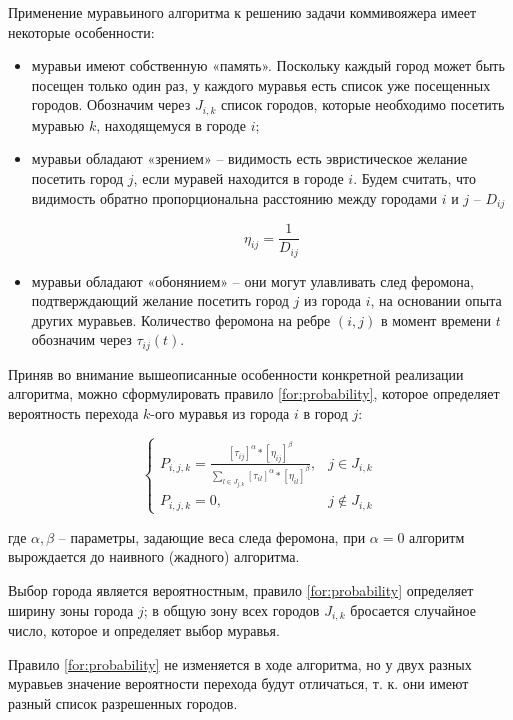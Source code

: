 Применение муравьиного алгоритма к решению задачи коммивояжера имеет некоторые особенности:
\begin{itemize}
\item муравьи имеют собственную «память». Поскольку каждый город может быть посещен только один раз, у каждого муравья есть список уже посещенных городов. Обозначим через $J_{i,k}$ список городов, которые необходимо посетить муравью $k$, находящемуся в городе $i$;

\item муравьи обладают «зрением» -- видимость есть эвристическое желание посетить город $j$, если муравей находится в городе $i$. Будем считать, что видимость обратно пропорциональна расстоянию между городами $i$ и $j$ -- $D_{ij}$

\begin{equation}
	\eta_{ij} = \frac{1}{D_{ij}}
\end{equation}	

\item муравьи обладают «обонянием» – они могут улавливать след феромона, подтверждающий желание посетить город $j$ из города $i$, на основании опыта других муравьев. Количество феромона на ребре $(i, j)$ в момент времени $t$ обозначим через $\tau_{ij} (t)$.
\end{itemize}

Приняв во внимание вышеописанные особенности конкретной реализации алгоритма, можно сформулировать правило \ref{for:probability}, которое определяет вероятность перехода $k$-ого муравья из города $i$ в город $j$:

\begin{equation}
\label{for:probability}
	\begin{cases}
		P_{i,j,k} = { \frac{[\tau_{ij}]^\alpha * [\eta_{ij}]^\beta}{\sum_{l \in J_{j,k}}[\tau_{il}]^\alpha * [\eta_{il}]^\beta }}, & j \in J_{i,k}\\
		P_{i,j,k} = 0, & j \not\in J_{i,k}
	\end{cases}
\end{equation}

где $\alpha, \beta$ -- параметры, задающие веса следа феромона, при $\alpha = 0$ алгоритм вырождается до наивного (жадного) алгоритма. 

Выбор города является вероятностным, правило \ref{for:probability} определяет ширину зоны города $j$; в общую зону всех городов $J_{i,k}$ бросается случайное число, которое и определяет выбор муравья.

Правило \ref{for:probability} не изменяется в ходе алгоритма, но у двух разных муравьев значение вероятности перехода будут отличаться, т. к. они имеют разный список разрешенных городов.

